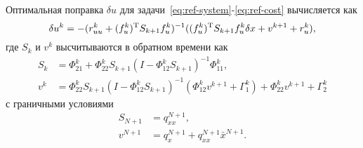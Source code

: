 \documentclass[../../doc.tex]{subfiles}
\begin{document}
    \begin{theorem}
        Оптимальная поправка $\delta u$ для задачи~\eqref{eq:ref-system}-\eqref{eq:ref-cost} вычисляется как
        \begin{equation}\label{eq:method-optimal-control-result}
            \delta u^k = - (r^k_{uu} + (f^k_u)^\textnormal{T} S_{k+1} f^k_u)^{-1} ((f^k_u)^\textnormal{T} S_{k+1} f^k_u \delta x + v^{k+1} + r^k_u),
        \end{equation}
        где $S_k$ и $v^{k}$ высчитываются в обратном времени как
        \begin{equation}\label{eq:method-s-v-result}
            \begin{aligned}
                S_k &= \Phi^k_{21} + \Phi^k_{22} S_{k+1} (I - \Phi^k_{12}S_{k+1})^{-1} \Phi^k_{11},
                \\
                v^k &= \Phi^k_{22} S_{k+1} ( I - \Phi^k_{12} S_{k+1})^{-1} (\Phi^k_{12} v^{k+1} + \Gamma^k_1) + \Phi^k_{22} v^{k+1} + \Gamma^k_2
            \end{aligned}
        \end{equation}
        с граничными условиями
        \begin{equation}\label{eq:method-s-v-boundary-result}
            \begin{aligned}
                S_{N+1} &= q^{N+1}_{xx},
                \\
                v^{N+1} &= q^{N+1}_{x} + q^{N+1}_{xx}\bar x^{N+1}.
            \end{aligned}
        \end{equation}
    \end{theorem}
    
\end{document}
